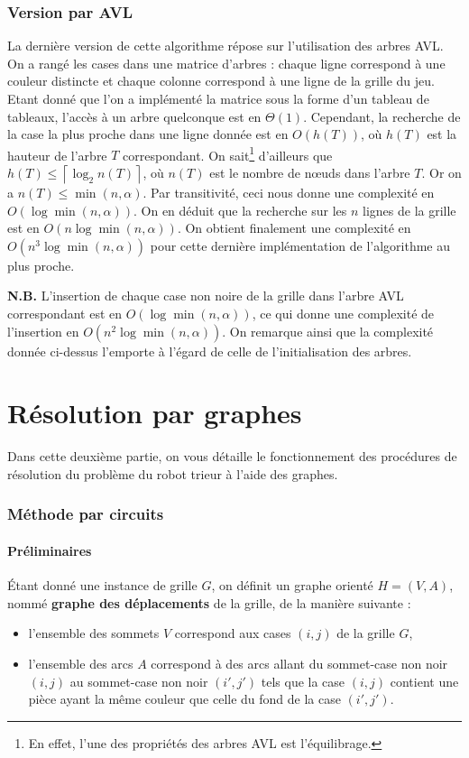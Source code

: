 \documentclass[12pt,a4paper]{article}
\begin{document}
\section{Version par AVL}
La derni\`ere version de cette algorithme r\'epose sur l'utilisation des 
arbres AVL. On a rang\'e les cases dans une matrice d'arbres : chaque ligne 
correspond \`a une couleur distincte et chaque colonne correspond \`a une ligne 
de la grille du jeu. Etant donn\'e que l'on a impl\'ement\'e la matrice sous la 
forme d'un tableau de tableaux, l'acc\`es \`a un arbre quelconque est en 
$\Theta(1)$. Cependant, la recherche de la case la plus proche dans une ligne 
donn\'ee est en $O(h(T))$, o\`u $h(T)$ est la hauteur de l'arbre $T$ 
correspondant. On sait\footnote{En effet, l'une des propri\'et\'es des arbres 
  AVL est l'\'equilibrage.} d'ailleurs que $h(T) \leq \left \lceil \log_2 n(T) 
\right \rceil$, o\`u $n(T)$ est le nombre de n\oe uds dans l'arbre $T$. Or on 
a $n(T) \leq \min(n,\alpha)$. Par transitivit\'e, ceci nous donne une 
complexit\'e en $O(\log \min(n,\alpha))$. 
On en d\'eduit que la recherche sur les $n$ lignes de la grille est en $O(n\log 
\min(n,\alpha))$. On obtient finalement une complexit\'e en $O(n^3\log 
\min(n,\alpha))$ pour cette derni\`ere impl\'ementation de l'algorithme au plus 
proche.

{\bfseries N.B.} L'insertion de chaque case non noire de la grille dans l'arbre 
AVL correspondant est en $O(\log \min(n,\alpha))$, ce qui donne une complexit\'e 
de l'insertion en $O(n^2\log \min(n,\alpha))$. On remarque ainsi que 
la complexit\'e donn\'ee ci-dessus l'emporte \`a l'\'egard de celle de 
l'initialisation des arbres.

\newpage

\part{R\'esolution par graphes}
Dans cette deuxi\`eme partie, on vous d\'etaille le fonctionnement des 
proc\'edures de r\'esolution du probl\`eme du robot trieur \`a l'aide des 
graphes.

\section{M\'ethode par circuits} \label{methcirc}
\subsection*{Pr\'eliminaires}
\'Etant donn\'e une instance de grille $G$, on d\'efinit un graphe orient\'e $H 
= (V,A)$, nomm\'e {\bfseries graphe des d\'eplacements} de la grille, de la 
mani\`ere suivante :
\begin{itemize}
\item l'ensemble des sommets $V$ correspond aux cases $(i,j)$ de la grille $G$,
\item l'ensemble des arcs $A$ correspond \`a des arcs allant du 
sommet-case non noir $(i,j)$ au sommet-case non noir $(i',j')$ tels que la case 
$(i,j)$ contient une pi\`ece ayant la m\^eme couleur que celle du fond de la 
case $(i',j')$.
\end{itemize}
\end{document}
